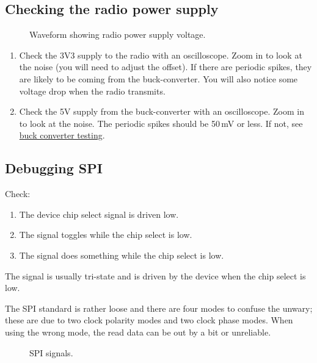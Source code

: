 \subsection{Checking the radio power supply}
\label{checking-the-radio-power-supply}

\begin{figure}[!h]
  \centering
  \caption{Waveform showing radio power supply voltage.}
\end{figure}

\begin{enumerate}
\item Check the 3V3 supply to the radio with an oscilloscope. Zoom in
  to look at the noise (you will need to adjust the offset).  If there
  are periodic spikes, they are likely to be coming from the
  buck-converter.  You will also notice some voltage drop when the
  radio transmits.

\item Check the 5V supply from the buck-converter with an
  oscilloscope.  Zoom in to look at the noise.  The periodic spikes
  should be 50\,mV or less.  If not, see
  \hyperref[buck-converter-testing]{buck converter testing}.
\end{enumerate}


\subsection{Debugging SPI}
\label{debugging-spi}

Check:
%
\begin{enumerate}
\item The device chip select signal is driven low.
\item The  signal toggles while the chip select is low.
\item The  signal does something while the chip select is low.
\end{enumerate}
%
The  signal is usually tri-state and is driven by the
device when the chip select is low.

The SPI standard is rather loose and there are four modes to confuse
the unwary; these are due to two clock polarity modes and two clock
phase modes.  When using the wrong mode, the read data can be out by a
bit or unreliable.

\begin{figure}[!h]
  \centering
  \caption{SPI signals.}
\end{figure}


